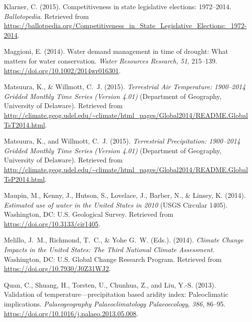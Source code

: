 \documentclass[draft,linenumbers]{agujournal}
\begin{document}
\begin{thebibliography}{33}
  Klarner, C. (2015).
  Competitiveness in state legislative elections: 1972--2014.
  \textit{Ballotopedia}.
  Retrieved from
  \url{https://ballotpedia.org/Competitiveness_in_State_Legislative_Elections:_1972-2014}.

  Maggioni, E. (2014).
  Water demand management in time of drought: {W}hat matters for water conservation.
  \textit{Water Resources Research}, \textit{51}, 215--139.
  \url{https://doi.org/10.1002/2014wr016301}.

  Matsuura, K., \& Willmott, C.~J. (2015{}).
  \textit{Terrestrial Air Temperature: 1900--2014 Gridded Monthly Time Series (Version 4.01)\/}
  (Department of  Geography, University of Delaware).
  Retrieved from
  \url{http://climate.geog.udel.edu/~climate/html_pages/Global2014/README.GlobalTsT2014.html}.

  Matsuura, K., and Willmott, C.~J. (2015{}).
  \textit{Terrestrial Precipitation: 1900--2014 Gridded Monthly Time Series (Version 4.01)\/}
  (Department of  Geography, University of Delaware).
  Retrieved from
  \url{http://climate.geog.udel.edu/~climate/html_pages/Global2014/README.GlobalTsP2014.html}.

  Maupin, M., Kenny, J., Hutson, S., Lovelace, J., Barber, N., \& Linsey, K. (2014).
  \textit{Estimated use of water in the {U}nited {S}tates in 2010\/}
  (USGS Circular 1405).
  Washington, DC: U.S. Geological Survey.
  Retrieved from
  \url{https://doi.org/10.3133/cir1405}.

  Melillo, J.~M., Richmond, T.~C., \&  Yohe G.~W. (Eds.). (2014).
  \textit{Climate Change Impacts in the {U}nited {S}tates: {T}he Third National Climate
  Assessment}.
  Washington, DC: U.S. Global Change Research Program.
  Retrieved from \url{https://doi.org/10.7930/J0Z31WJ2}.

  Quan, C., Shuang, H., Torsten, U., Chunhua, Z., and Liu, Y.-S. (2013).
  Validation of temperature---precipitation based aridity index: Paleoclimatic
  implications.
  \textit{Palaeogeography Palaeoclimatology Palaeoecology}, \textit{386}, 86--95.
  \url{https://doi.org/10.1016/j.palaeo.2013.05.008}.


\end{thebibliography}
\end{document}

